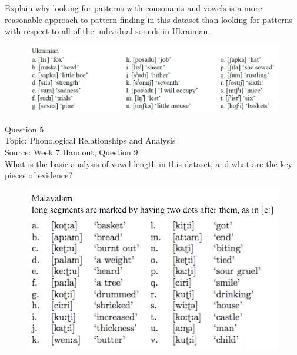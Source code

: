 \documentclass[12pt]{article}
\begin{document}
Explain why looking for patterns with consonants and vowels is a more reasonable approach to pattern finding in this dataset than looking for patterns with respect to all of the individual sounds in Ukrainian.\\

\begin{figure}[H]
\includegraphics{../images/ukrainian.png}
\end{figure}

\newpage

{\large Question 5}\\

Topic: Phonological Relationships and Analysis\\
Source: Week 7 Handout, Question 9\\

What is the basic analysis of vowel length in this dataset, and what are the key pieces of evidence?\\

\begin{figure}[H]
\includegraphics{../images/malayalam.png}
\end{figure}

\newpage

\begin{center}
\textbf{{\color{red}{\HUGE END OF EXAM}}}\\

\end{center}
\newpage
\end{document}
